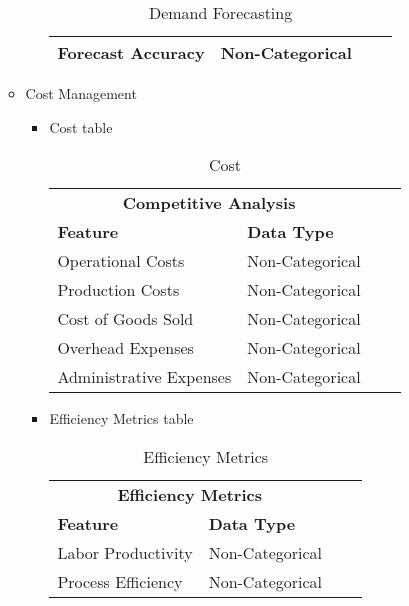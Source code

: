 \documentclass[12pt,a4Paper]{article}
\begin{document}
\begin{enumerate}
\begin{itemize}
\begin{itemize}
\begin{table}
\begin{tabular}{llll}
		Forecast Accuracy & Non-Categorical\\\hline
		\end{tabular}
		\centering
		\caption{Demand Forecasting}
		\end{table}
		\end{itemize}
	\item Cost Management
		\begin{itemize}
		\item Cost table
		\begin{table}
		\begin{tabular}{llll}\hline
		\multicolumn{2}{c}{\textbf{Competitive Analysis}} & &\\
		\textbf{Feature} & \textbf{Data Type}\\\hline
		Operational Costs & Non-Categorical\\
		Production Costs & Non-Categorical\\
		Cost of Goods Sold & Non-Categorical\\
		Overhead Expenses & Non-Categorical\\
		Administrative Expenses & Non-Categorical\\\hline
		\end{tabular}
		\centering
		\caption{Cost}
		\end{table}
		\item Efficiency Metrics table
		\begin{table}
		\begin{tabular}{llll}\hline
		\multicolumn{2}{c}{\textbf{Efficiency Metrics}} & &\\
		\textbf{Feature} & \textbf{Data Type}\\\hline
		Labor Productivity & Non-Categorical\\
		Process Efficiency & Non-Categorical\\\hline
		\end{tabular}
		\centering
		\caption{Efficiency Metrics}
		\end{table}
		\end{itemize}
	\end{itemize}
\end{enumerate}
\end{document}
